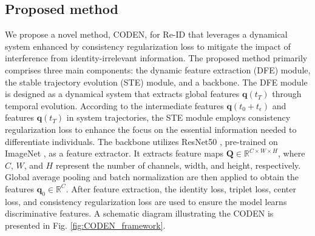 \documentclass[12pt]{spieman}  %
\begin{document}
\begin{spacing}{2}
		\section{Proposed method} \label{section:proposed_method}
		We propose a novel method, CODEN, for Re-ID that leverages a dynamical system enhanced by consistency regularization loss to mitigate the impact of interference from identity-irrelevant information. The proposed method primarily comprises three main components: the dynamic feature extraction (DFE) module, the stable trajectory evolution (STE) module, and a backbone. The DFE module is designed as a dynamical system that extracts global features $\boldsymbol{q}(t_T)$ through temporal evolution. According to the intermediate features $\boldsymbol{q}(t_0 + t_\epsilon)$ and features $\boldsymbol{q}(t_T)$ in system trajectories, the STE module employs consistency regularization loss to enhance the focus on the essential information needed to differentiate individuals. The backbone utilizes ResNet50 \cite{he2016deep}, pre-trained on ImageNet \cite{russakovsky2015imagenet}, as a feature extractor. It extracts feature maps $\boldsymbol{Q} \in \mathbb{R}^{C \times W \times H}$, where $C$, $W$, and $H$ represent the number of channels, width, and height, respectively. Global average pooling and batch normalization are then applied to obtain the features $\boldsymbol{q}_0 \in \mathbb{R}^C$. After feature extraction, the identity loss, triplet loss, center loss, and consistency regularization loss are used to ensure the model learns discriminative features. A schematic diagram illustrating the CODEN is presented in Fig. \ref{fig:CODEN_framework}.
		

\end{spacing}
\end{document}
